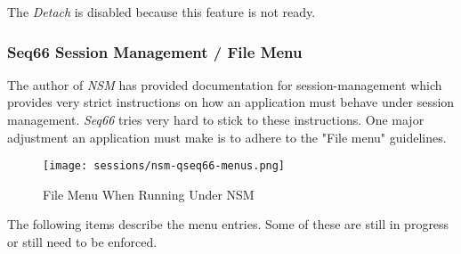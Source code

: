    The \textsl{Detach} is disabled because this feature is not ready.

\subsubsection{Seq66 Session Management / File Menu}
\label{subsubsec:sessions_file_menu}

   The author of \textsl{NSM} has provided documentation for session-management
   which provides very strict instructions on how an application must behave
   under session management.  \textsl{Seq66} tries very hard to stick to these
   instructions.  One major adjustment an application must make is to adhere to
   the "File menu" guidelines.

\begin{figure}[H]
   \centering 
   \texttt{[image: sessions/nsm-qseq66-menus.png]}
   \caption*{File Menu When Running Under NSM}
\end{figure}

   The following items describe the menu entries.  Some of these are still in
   progress or still need to be enforced.

